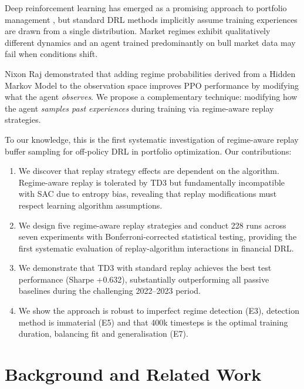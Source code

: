 \documentclass[11pt,a4paper]{article}
\begin{document}
Deep reinforcement learning has emerged as a promising approach to portfolio management \citep{yang2020deep, drl_survey2024}, but standard DRL methods implicitly assume training experiences are drawn from a single distribution. Market regimes exhibit qualitatively different dynamics \citep{hamilton1989regime} and an agent trained predominantly on bull market data may fail when conditions shift.

Nixon Raj \citep{nixon2025regime} demonstrated that adding regime probabilities derived from a Hidden Markov Model to the observation space improves PPO performance by modifying what the agent \textit{observes}. We propose a complementary technique: modifying how the agent \textit{samples past experiences} during training via regime-aware replay strategies.

To our knowledge, this is the first systematic investigation of regime-aware replay buffer sampling for off-policy DRL in portfolio optimization. Our contributions:

\begin{enumerate}
    \item We discover that replay strategy effects are dependent on the algorithm. Regime-aware replay is tolerated by TD3 but fundamentally incompatible with SAC due to entropy bias, revealing that replay modifications must respect learning algorithm assumptions.

    \item We design five regime-aware replay strategies and conduct 228 runs across seven experiments with Bonferroni-corrected statistical testing, providing the first systematic evaluation of replay-algorithm interactions in financial DRL.

    \item We demonstrate that TD3 with standard replay achieves the best test performance (Sharpe +0.632), substantially outperforming all passive baselines during the challenging 2022–2023 period.

    \item We show the approach is robust to imperfect regime detection (E3), detection method is immaterial (E5) and that 400k timesteps is the optimal training duration, balancing fit and generalisation (E7).
\end{enumerate}


\section{Background and Related Work}
\label{sec:background}
\end{document}

